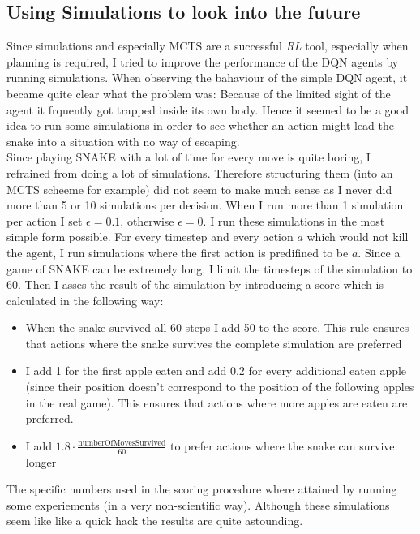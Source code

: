 \documentclass{article}
\newcommand{\RL}{\emph{RL} }
\begin{document}
\subsection{Using Simulations to look into the future}

Since simulations and especially MCTS are a successful \RL tool, especially when planning is required, I tried to improve the performance of the DQN agents by running simulations. When observing the bahaviour of the simple DQN agent, it became quite clear what the problem was: Because of the limited sight of the agent it frquently got trapped inside its own body. Hence it seemed to be a good idea to run some simulations in order to see whether an action might lead the snake into a situation with no way of escaping.\\
Since playing SNAKE with a lot of time for every move is quite boring, I refrained from doing a lot of simulations. Therefore structuring them (into an MCTS scheeme for example) did not seem to make much sense as I never did more than 5 or 10 simulations per decision. When I run more than 1 simulation per action I set $\epsilon=0.1$, otherwise $\epsilon=0$. I run these simulations in the most simple form possible. For every timestep and every action $a$ which would not kill the agent, I run simulations where the first action is predifined to be $a$. Since a game of SNAKE can be extremely long, I limit the timesteps of the simulation to 60. Then I asses the result of the simulation by introducing a score which is calculated in the following way:
\begin{itemize}
	\item When the snake survived all 60 steps I add 50 to the score. This rule ensures that actions where the snake survives the complete simulation are preferred
	\item I add 1 for the first apple eaten and add 0.2 for every additional eaten apple (since their position doesn't correspond to the position of the following apples in the real game). This ensures that actions where more apples are eaten are preferred.
	\item I add $1.8 \cdot \frac{\text{numberOfMovesSurvived}}{60}$ to prefer actions where the snake can survive longer
\end{itemize}

The specific numbers used in the scoring procedure where attained by running some experiements (in a very non-scientific way). Although these simulations seem like like a quick hack the results are quite astounding.
\end{document}
